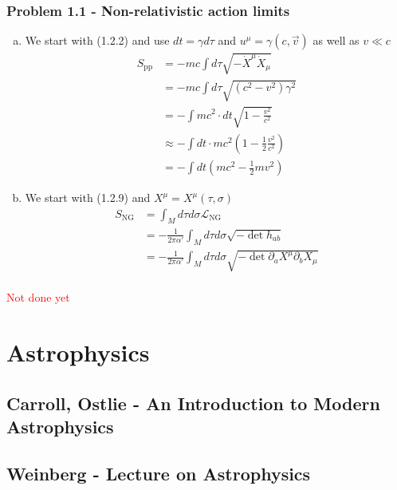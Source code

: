 \documentclass[10pt,a4paper]{article}
\theoremstyle{definition}
\begin{document}
\subsubsection{Problem 1.1 - Non-relativistic action limits}
\begin{enumerate}[(a)]
    \item We start with (1.2.2) and use $dt=\gamma d\tau$ and $u^\mu=\gamma(c,\vec{v})$ as well as $v\ll c$
    \begin{align}
        S_\text{pp}&=-mc\int d\tau\sqrt{-\dot X^\mu\dot X_\mu}\\
        &=-mc\int d\tau\sqrt{(c^2-v^2)\gamma^2}\\
        &=-\int mc^2\cdot dt\sqrt{1-\frac{v^2}{c^2}}\\
        &\approx-\int dt\cdot mc^2\left(1-\frac{1}{2}\frac{v^2}{c^2}\right)\\
        &=-\int dt\left(mc^2-\frac{1}{2}mv^2\right)
    \end{align}
    
    \item We start with (1.2.9) and $X^\mu=X^\mu(\tau,\sigma)$
    \begin{align}
        S_\text{NG}
        &=\int_Md\tau d\sigma \mathcal{L}_\text{NG}\\
        &=-\frac{1}{2\pi\alpha'}\int_Md\tau d\sigma \sqrt{-\det h_{ab}}\\
        &=-\frac{1}{2\pi\alpha'}\int_Md\tau d\sigma \sqrt{-\det \partial_aX^\mu\partial_bX_\mu}\\
    \end{align}
    
\end{enumerate}

\textcolor{red}{Not done yet}

\section{Astrophysics}
\subsection{{\sc Carroll, Ostlie} - An Introduction to Modern Astrophysics}
\subsection{{\sc Weinberg} - Lecture on Astrophysics}
\end{document}

